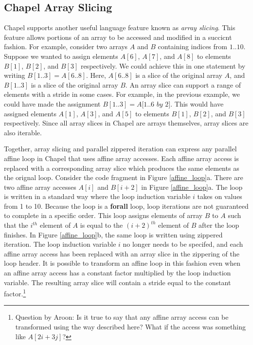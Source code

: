 \subsection{Chapel Array Slicing}\label{sec:array_slicing}

Chapel supports another useful language feature known as \textit{array slicing}. This feature allows portions of an array to be accessed and modified in a succicnt fashion. For example, consider two arrays $A$ and $B$ containing indices from $1..10$. Suppose we wanted to assign elements $A[6]$, $A[7]$, and $A[8]$ to elements $B[1]$, $B[2]$, and $B[3]$ respectively. We could achieve this in one statement by writing $B[1..3] = A[6..8]$. Here, $A[6..8]$ is a slice of the original array $A$, and $B[1..3]$ is a slice of the original array $B$. An array slice can support a range of elements with a stride in some cases. For example, in the previous example, we could have made the assignment $B[1..3] = A[1..6$  $by$  $2]$. This would have assigned elements $A[1]$, $A[3]$, and $A[5]$ to elements $B[1]$, $B[2]$, and $B[3]$ respectively. Since all array slices in Chapel are arrays themselves, array slices are also iterable. 

Together, array slicing and parallel zippered iteration can express any parallel affine loop in Chapel that uses affine array accesses. Each affine array access is replaced with a corresponding array slice which produces the same elements as the orignal loop. Consider the code fragment in Figure \ref{affine_loop}a. There are two affine array accesses $A[i]$ and $B[i+2]$ in Figure \ref{affine_loop}a. The loop is written in a standard way where the loop induction variable $i$ takes on values from 1 to 10. Because the loop is a \textbf{forall} loop, loop iterations are not guaranteed to complete in a specific order. This loop assigns elements of array $B$ to $A$ such that the $i^{th}$ element of $A$ is equal to the $(i+2)^{th}$ element of $B$ after the loop finishes. In Figure \ref{affine_loop}b, the same loop is written using zippered iteration. The loop induction variable $i$ no longer needs to be specifed, and each affine array access has been replaced with an array slice in the zippering of the loop header. It is possible to transform an affine loop in this fashion even when an affine array access has a constant factor multiplied by the loop induction variable. The resulting array slice will contain a stride equal to the constant factor.\footnote{Question by Aroon: Is it true to say that any affine array access can be transformed using the way described here? What if the access was something like $A[2i+3j]$?}

